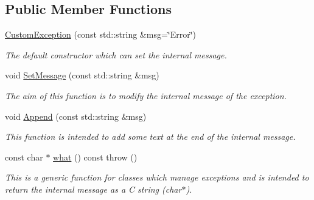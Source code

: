\subsection*{Public Member Functions}
\begin{DoxyCompactItemize}
\item 
\mbox{\label{classCustomException_a07dbd163547759b7390b6f4588fff5a8}} 
\hyperlink{classCustomException_a07dbd163547759b7390b6f4588fff5a8}{Custom\+Exception} (const std\+::string \&msg=\char`\"{}Error\char`\"{})
\begin{DoxyCompactList}\small\item\em The default constructor which can set the internal message. \end{DoxyCompactList}\item 
\mbox{\label{classCustomException_a54289001348effb40f5780bb7f263abb}} 
void \hyperlink{classCustomException_a54289001348effb40f5780bb7f263abb}{Set\+Message} (const std\+::string \&msg)
\begin{DoxyCompactList}\small\item\em The aim of this function is to modify the internal message of the exception. \end{DoxyCompactList}\item 
\mbox{\label{classCustomException_ab8885c65813f31562bccdcce422b798c}} 
void \hyperlink{classCustomException_ab8885c65813f31562bccdcce422b798c}{Append} (const std\+::string \&msg)
\begin{DoxyCompactList}\small\item\em This function is intended to add some text at the end of the internal message. \end{DoxyCompactList}\item 
\mbox{\label{classCustomException_a0bb1756d6073f5bb8b6f1486b08fa5da}} 
const char $\ast$ \hyperlink{classCustomException_a0bb1756d6073f5bb8b6f1486b08fa5da}{what} () const  throw ()
\begin{DoxyCompactList}\small\item\em This is a generic function for classes which manage exceptions and is intended to return the internal message as a C string ({\ttfamily char$\ast$}). \end{DoxyCompactList}\end{DoxyCompactItemize}


